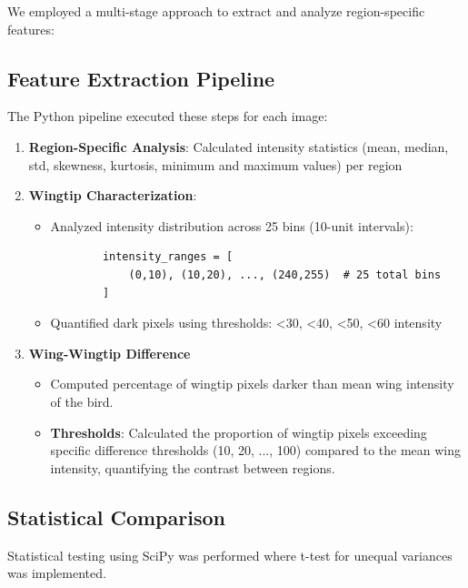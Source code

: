 \documentclass[a4paper,12pt]{report}
\begin{document}

We employed a multi-stage approach to extract and analyze region-specific features:

\subsection{Feature Extraction Pipeline}
The Python pipeline executed these steps for each image:
\begin{enumerate}
    \item \textbf{Region-Specific Analysis}: Calculated intensity statistics (mean, median, std, skewness, kurtosis, minimum and maximum values) per region
 
    \item \textbf{Wingtip Characterization}:
    \begin{itemize}
        \item Analyzed intensity distribution across 25 bins (10-unit intervals):
        \begin{verbatim}
        intensity_ranges = [
            (0,10), (10,20), ..., (240,255)  # 25 total bins
        ]
        \end{verbatim}
        \item Quantified dark pixels using thresholds: <30, <40, <50, <60 intensity
    \end{itemize}
    \item \textbf{Wing-Wingtip Difference}
    \begin{itemize}
        \item Computed percentage of wingtip pixels darker than mean wing intensity of the bird.
        \item \textbf{Thresholds}: Calculated the proportion of wingtip pixels exceeding specific difference thresholds (10, 20, ..., 100) compared to the mean wing intensity, quantifying the contrast between regions.
    \end{itemize}
\end{enumerate}

\subsection{Statistical Comparison}
Statistical testing using SciPy was performed where t-test for unequal variances was implemented.


\end{document}
